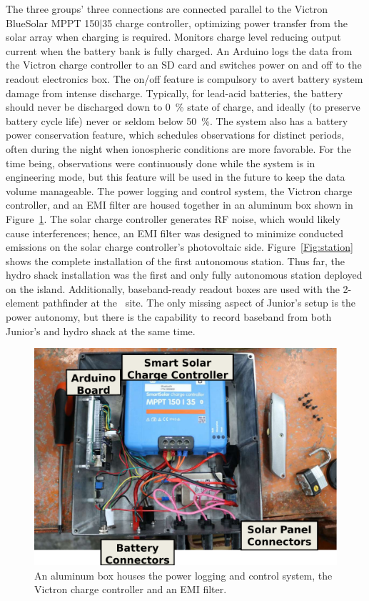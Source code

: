 The three groups' three connections are connected parallel to the Victron BlueSolar MPPT 150$\vert$35 charge controller, optimizing power transfer from the solar array when charging is required. Monitors charge level reducing output current when the battery bank is fully charged. An Arduino logs the data from the Victron charge controller to an SD card and switches power on and off to the readout electronics box. The on/off feature is compulsory to avert battery system damage from intense discharge. Typically, for lead-acid batteries, the battery should never be discharged down to \SI{0}{\percent} state of charge, and ideally (to preserve battery cycle life) never or seldom below \SI{50}{\percent}. The system also has a battery power conservation feature, which schedules observations for distinct periods, often during the night when ionospheric conditions are more favorable. For the time being, observations were continuously done while the system is in engineering mode, but this feature will be used in the future to keep the data volume manageable. The power logging and control system, the Victron charge controller, and an EMI filter are housed together in an aluminum box shown in Figure~\ref{Fig:power_box_interior}. The solar charge controller generates RF noise, which would likely cause interferences; hence, an EMI filter was designed to minimize conducted emissions on the solar charge controller's photovoltaic side. Figure~\ref{Fig:station} shows the complete installation of the first autonomous station. Thus far, the hydro shack installation was the first and only fully autonomous station deployed on the island. Additionally, baseband-ready readout boxes are used with the 2-element pathfinder at the \prizm\ site. The only missing aspect of Junior's setup is the power autonomy, but there is the capability to record baseband from both Junior's and hydro shack at the same time.

\begin{figure}
	\centering
	\includegraphics[width=\linewidth]{Figures/power_box_interior}
	\caption{An aluminum box houses the power logging and control system, the Victron charge controller and an EMI filter.}
	\label{Fig:power_box_interior}
\end{figure}

